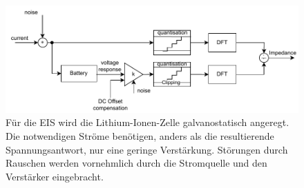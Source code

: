 \begin{figure}[h] 
	\centering 
	\includegraphics[width=1.1\columnwidth]{../img/histo_real.pdf}
	\caption{Für die EIS wird die Lithium-Ionen-Zelle galvanostatisch angeregt. Die notwendigen Ströme benötigen, anders als die resultierende Spannungsantwort, nur eine geringe Verstärkung. Störungen durch Rauschen werden vornehmlich durch die Stromquelle und den Verstärker eingebracht.}
	\label{fig:system}
\end{figure}
